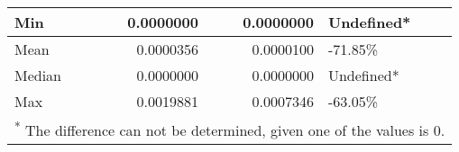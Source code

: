 \begin{table}
\begin{tabular}[t]{l|r|r|l}
\hline
\hspace{1em}Min & 0.0000000 & 0.0000000 & Undefined*\\
\hline
\hspace{1em}Mean & 0.0000356 & 0.0000100 & -71.85\%\\
\hline
\hspace{1em}Median & 0.0000000 & 0.0000000 & Undefined*\\
\hline
\hspace{1em}Max & 0.0019881 & 0.0007346 & -63.05\%\\
\hline
\multicolumn{4}{l}{\rule{0pt}{1em}\textsuperscript{*} The difference can not be determined, given one of the values is 0.}\\
\end{tabular}
\end{table}
